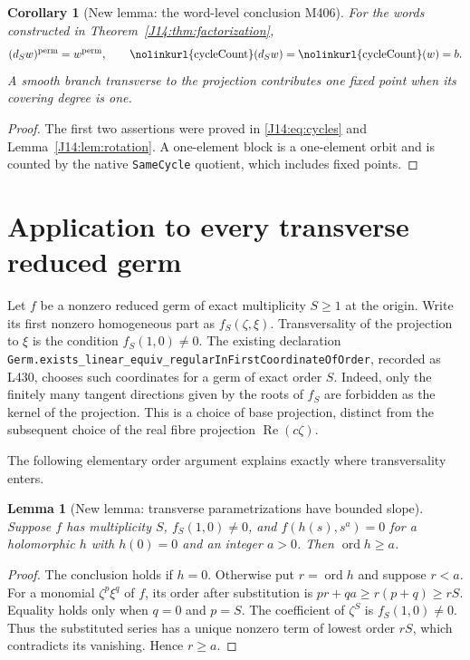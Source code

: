 \documentclass[11pt,oneside]{report}
\newtheorem{lemma}[theorem]{Lemma}
\newtheorem{corollary}[theorem]{Corollary}
\theoremstyle{definition}
\numberwithin{equation}{section}
\newcommand{\decl}[1]{\textnormal{\nolinkurl{#1}}}
\newcommand{\ord}{\operatorname{ord}}
\newcommand{\Ree}{\operatorname{Re}}
\begin{document}
\begin{corollary}[New lemma: the word-level conclusion M406]
\label{J14:cor:cycles}
For the words constructed in Theorem~\ref{J14:thm:factorization},
\[
 (d_Sw)^{\rm perm}=w^{\rm perm},\qquad
 \decl{cycleCount}(d_Sw)=\decl{cycleCount}(w)=b.
\]
A smooth branch transverse to the projection contributes one fixed point
when its covering degree is one.
\end{corollary}
\begin{proof}
The first two assertions were proved in \eqref{J14:eq:cycles} and
Lemma~\ref{J14:lem:rotation}. A one-element block is a one-element orbit and is
counted by the native \decl{SameCycle} quotient, which includes fixed points.
\end{proof}

\section{Application to every transverse reduced germ}
\label{J14:sec:curve}

Let $f$ be a nonzero reduced germ of exact multiplicity $S\geq1$ at the
origin. Write its first nonzero homogeneous part as $f_S(\zeta,\xi)$.
Transversality of the projection to $\xi$ is the condition
$f_S(1,0)\ne0$. The existing declaration
\decl{Germ.exists_linear_equiv_regularInFirstCoordinateOfOrder}, recorded
as L430, chooses such coordinates for a germ of exact order $S$.
Indeed, only the finitely many tangent directions given by the roots of
$f_S$ are forbidden as the kernel of the projection. This is a choice of
base projection, distinct from the subsequent choice of the real fibre
projection $\Ree(c\zeta)$.

The following elementary order argument explains exactly where
transversality enters.

\begin{lemma}[New lemma: transverse parametrizations have bounded slope]
\label{J14:lem:slope}
Suppose $f$ has multiplicity $S$, $f_S(1,0)\ne0$, and
$f(h(s),s^a)=0$ for a holomorphic $h$ with $h(0)=0$ and an integer $a>0$.
Then $\ord h\geq a$.
\end{lemma}
\begin{proof}
The conclusion holds if $h=0$. Otherwise put $r=\ord h$ and suppose $r<a$.
For a monomial $\zeta^p\xi^q$ of $f$, its order after substitution is
$pr+qa\geq r(p+q)\geq rS$.
Equality holds only when $q=0$ and $p=S$.
The coefficient of $\zeta^S$ is $f_S(1,0)\ne0$.
Thus the substituted series has a unique nonzero term of lowest order
$rS$, which contradicts its vanishing. Hence $r\geq a$.
\end{proof}
\end{document}
